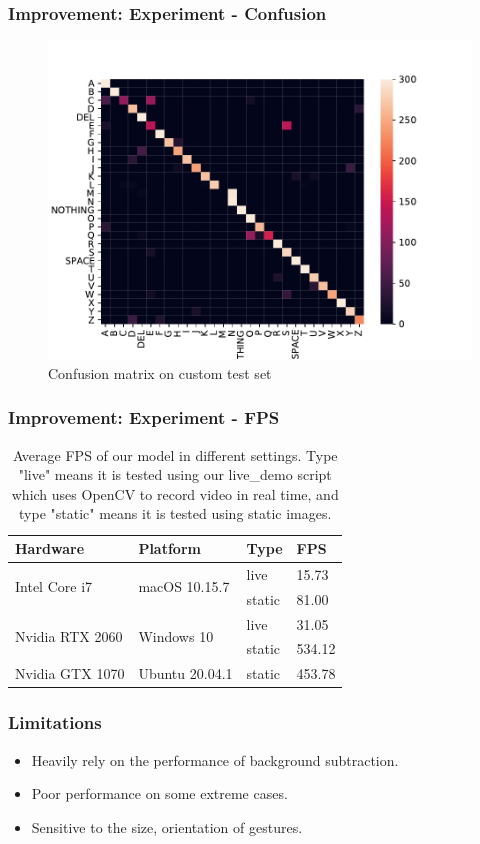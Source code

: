 \documentclass[handout]{beamer}
\begin{document}
\begin{frame}
\frametitle{Improvement: Experiment - Confusion}

\begin{figure}[h]
\begin{center}
\includegraphics[width=0.7\linewidth]{imgs/confusion}
\end{center}
   \caption{Confusion matrix on custom test set}
\label{fig:confusion}
\end{figure}

\end{frame}

\begin{frame}
\frametitle{Improvement: Experiment - FPS}

\begin{table}[h]
\begin{center}
\begin{tabular}{|l|l|l|l|}
\hline
Hardware              & Platform                & Type   & FPS \\ \hline\hline
\multirow{2}{*}{Intel Core i7}   & \multirow{2}{*}{macOS 10.15.7}  & live   & 15.73  \\ \cline{3-4} 
                      &                         & static & 81.00  \\ \hline
\multirow{2}{*}{Nvidia RTX 2060} & \multirow{2}{*}{Windows 10} & live   & 31.05  \\ \cline{3-4} 
                      &                         & static & 534.12 \\ \hline
Nvidia GTX 1070 & Ubuntu 20.04.1 & static & 453.78 \\ \hline                    
\end{tabular}
\end{center}
\caption{Average FPS of our model in different settings. Type "live" means it is tested using our live\_demo script which uses OpenCV to record video in real time, and type "static" means it is tested using static images.}
\label{table:fps}
\end{table}

\end{frame}

\begin{frame}
\frametitle{Limitations}

\begin{itemize}
	\item Heavily rely on the performance of background subtraction.
	\item Poor performance on some extreme cases.
	\item Sensitive to the size, orientation of gestures. 
\end{itemize}

\end{frame}
\end{document}
